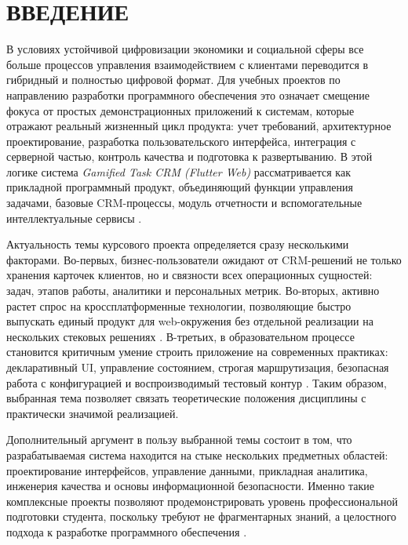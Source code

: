 \section*{ВВЕДЕНИЕ}

В условиях устойчивой цифровизации экономики и социальной сферы все больше процессов управления взаимодействием с клиентами переводится в гибридный и полностью цифровой формат. Для учебных проектов по направлению разработки программного обеспечения это означает смещение фокуса от простых демонстрационных приложений к системам, которые отражают реальный жизненный цикл продукта: учет требований, архитектурное проектирование, разработка пользовательского интерфейса, интеграция с серверной частью, контроль качества и подготовка к развертыванию. В этой логике система \textit{Gamified Task CRM (Flutter Web)} рассматривается как прикладной программный продукт, объединяющий функции управления задачами, базовые CRM-процессы, модуль отчетности и вспомогательные интеллектуальные сервисы \cite{repoReadme,docsIndex}.

Актуальность темы курсового проекта определяется сразу несколькими факторами. Во-первых, бизнес-пользователи ожидают от CRM-решений не только хранения карточек клиентов, но и связности всех операционных сущностей: задач, этапов работы, аналитики и персональных метрик. Во-вторых, активно растет спрос на кроссплатформенные технологии, позволяющие быстро выпускать единый продукт для web-окружения без отдельной реализации на нескольких стековых решениях \cite{flutterDocs,dartDocs}. В-третьих, в образовательном процессе становится критичным умение строить приложение на современных практиках: декларативный UI, управление состоянием, строгая маршрутизация, безопасная работа с конфигурацией и воспроизводимый тестовый контур \cite{riverpodDocs,goRouterDocs,owaspM10}. Таким образом, выбранная тема позволяет связать теоретические положения дисциплины с практически значимой реализацией.

Дополнительный аргумент в пользу выбранной темы состоит в том, что разрабатываемая система находится на стыке нескольких предметных областей: проектирование интерфейсов, управление данными, прикладная аналитика, инженерия качества и основы информационной безопасности. Именно такие комплексные проекты позволяют продемонстрировать уровень профессиональной подготовки студента, поскольку требуют не фрагментарных знаний, а целостного подхода к разработке программного обеспечения \cite{sommerville,cleanArchitecture}.

